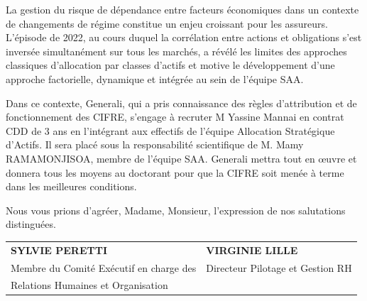 \documentclass[11pt,a4paper]{article}
\begin{document}
La gestion du risque de dépendance entre facteurs économiques dans un contexte de
changements de régime constitue un enjeu croissant pour les assureurs. L'épisode
de 2022, au cours duquel la corrélation entre actions et obligations s'est inversée
simultanément sur tous les marchés, a révélé les limites des approches classiques
d'allocation par classes d'actifs et motive le développement d'une approche
factorielle, dynamique et intégrée au sein de l'équipe SAA.

Dans ce contexte, Generali, qui a pris connaissance des règles d'attribution et de
fonctionnement des CIFRE, s'engage à recruter M Yassine Mannai en contrat CDD de
3 ans en l'intégrant aux effectifs de l'équipe Allocation Stratégique d'Actifs. Il
sera placé sous la responsabilité scientifique de M. Mamy RAMAMONJISOA, membre de
l'équipe SAA. Generali mettra tout en \oe{}uvre et donnera tous les moyens au
doctorant pour que la CIFRE soit menée à terme dans les meilleures conditions.

\medskip

Nous vous prions d'agréer, Madame, Monsieur, l'expression de nos salutations
distinguées.

\vspace{2cm}

\noindent
\begin{tabularx}{\textwidth}{@{}X X@{}}
\textbf{SYLVIE PERETTI} & \textbf{VIRGINIE LILLE} \\[4pt]
Membre du Comité Exécutif en charge des & Directeur Pilotage et Gestion RH \\
Relations Humaines et Organisation & \\
\end{tabularx}
\end{document}
